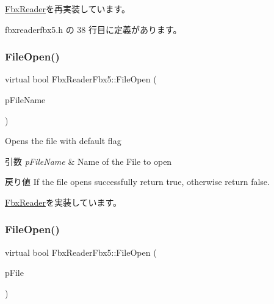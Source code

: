 \hyperlink{class_fbx_reader_a345b292805ea8799a9d962714e1ad9a5}{Fbx\+Reader}を再実装しています。



 fbxreaderfbx5.\+h の 38 行目に定義があります。

\mbox{\label{class_fbx_reader_fbx5_a1aef8cc95eae3b44812beef48d6edb5d}} 
\subsubsection{\texorpdfstring{File\+Open()}{FileOpen()}\hspace{0.1cm}{\footnotesize\ttfamily [3/5]}}
{\footnotesize\ttfamily virtual bool Fbx\+Reader\+Fbx5\+::\+File\+Open (\begin{DoxyParamCaption}\item[{char $\ast$}]{p\+File\+Name }\end{DoxyParamCaption})\hspace{0.3cm}{\ttfamily [virtual]}}

Opens the file with default flag 
\begin{DoxyParams}{引数}
{\em p\+File\+Name} & Name of the File to open \\
\hline
\end{DoxyParams}
\begin{DoxyReturn}{戻り値}
If the file opens successfully return {\ttfamily true}, otherwise return {\ttfamily false}. 
\end{DoxyReturn}


\hyperlink{class_fbx_reader_a6105bd37ae86c03f35aee6f62901856d}{Fbx\+Reader}を実装しています。

\mbox{\label{class_fbx_reader_fbx5_ad48fa87e086b236db57f57eed5f50ddb}} 
\subsubsection{\texorpdfstring{File\+Open()}{FileOpen()}\hspace{0.1cm}{\footnotesize\ttfamily [4/5]}}
{\footnotesize\ttfamily virtual bool Fbx\+Reader\+Fbx5\+::\+File\+Open (\begin{DoxyParamCaption}\item[{\hyperlink{class_fbx_file}{Fbx\+File} $\ast$}]{p\+File }\end{DoxyParamCaption})\hspace{0.3cm}{\ttfamily [virtual]}}




